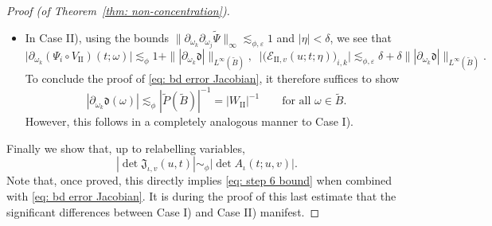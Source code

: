 \documentclass[reqno]{amsart}
\numberwithin{equation}{section}
\newcommand{\cE}{\mathcal{E}}
\newcommand{\fd}{\mathfrak{d}}
\newcommand{\fJ}{\mathfrak{J}}
\theoremstyle{plain}
\theoremstyle{definition}
\newcommand{\tII}{\mathrm{II}}
\begin{document}
\begin{proof}[Proof (of Theorem~\ref{thm: non-concentration})]
\begin{itemize}
\item In Case II), using the bounds $\|\partial_{\omega_k}\partial_{\omega_j}\widetilde{\Psi}\|_{\infty} \lesssim_{\phi, \varepsilon} 1$ and $|\eta| < \delta$, we see that
\begin{equation*}
  \big|\partial_{\omega_k}(\Psi_i \circ V_{\tII})(t;\omega)\big| \lesssim_{\phi} 1 + \||\partial_{\omega_k}\fd|\|_{L^{\infty}(\widetilde{B})}, \;\; \big|\big(\cE_{\tII,v}(u;t;\eta)\big)_{i,k}\big| \lesssim_{\phi, \varepsilon} \delta + \delta\||\partial_{\omega_k}\fd|\|_{L^{\infty}(\widetilde{B})}.
\end{equation*}
To conclude the proof of \eqref{eq: bd error Jacobian}, it therefore suffices to show
\begin{equation*}
    |\partial_{\omega_k}\fd(\omega)|\lesssim_\phi |\widetilde{P}(\widetilde{B})|^{-1}=|W_{\tII}|^{-1} \qquad \textrm{for all $\omega \in \widetilde{B}$.}
\end{equation*} 
However, this follows in a completely analogous manner to Case I).
\end{itemize}
Finally we show that, up to relabelling variables,
\begin{equation*}
    |\det \fJ_{\iota,v}(u,t)|\sim_\phi|\det A_{\iota}(t;u,v)|.
\end{equation*}
Note that, once proved, this directly implies \eqref{eq: step 6 bound} when combined with \eqref{eq: bd error Jacobian}. It is during the proof of this last estimate that the significant differences between Case I) and Case II) manifest. 


\end{proof}
\end{document}
